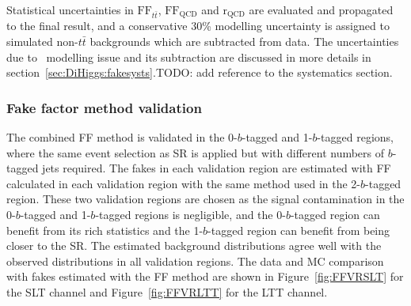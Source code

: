 Statistical uncertainties in $\text{FF}_{t\bar{t}}$, $\text{FF}_\text{QCD}$ and $\mathrm{r}_\text{QCD}$
are evaluated and propagated to the final result,
and a conservative 30\% modelling uncertainty is assigned to simulated non-$t\bar t$ backgrounds
which are subtracted from data.
The uncertainties due to \ttbar\ modelling issue and its subtraction are discussed in more details
in section~\ref{sec:DiHiggs:fakesysts}.TODO: add reference to the systematics section.

\subsubsection{Fake factor method validation}
The combined FF method is validated in
the 0-$b$-tagged and 1-$b$-tagged regions, where the same event selection as SR 
is applied but with different numbers of $b$-tagged jets required. 
The fakes in each validation region are estimated with FF calculated in each validation region 
with the same method used in the 2-$b$-tagged region.
These two validation regions are chosen as 
the signal contamination in the 0-$b$-tagged 
and 1-$b$-tagged regions is negligible,
and the 0-$b$-tagged region can benefit from its rich statistics 
and the 1-$b$-tagged region can benefit from being closer to the SR.
The estimated background distributions agree well 
with the observed distributions in all validation regions.
The data and MC comparison with fakes estimated with the FF method 
are shown in Figure~\ref{fig:FFVRSLT} for the SLT channel and
Figure~\ref{fig:FFVRLTT} for the LTT channel. 

